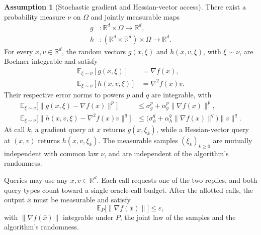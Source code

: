 \documentclass[10pt]{article}
\theoremstyle{definition}
\newtheorem{assumption}{Assumption}
\begin{document}
\begin{assumption}[Stochastic gradient and Hessian-vector access]
There exist a probability measure $\nu$ on $\Omega$ and jointly measurable maps
\[
\begin{aligned}
g &: \mathbb{R}^d\times\Omega\to\mathbb{R}^d,\\
h &: (\mathbb{R}^d\times\mathbb{R}^d)\times\Omega\to\mathbb{R}^d.
\end{aligned}
\]
For every $x,v\in\mathbb{R}^d$, the random vectors $g(x,\xi)$ and $h(x,v,\xi)$, with $\xi\sim\nu$, are Bochner integrable and satisfy
\[
\begin{aligned}
\mathbb{E}_{\xi\sim\nu}[g(x,\xi)]&=\nabla f(x),\\
\mathbb{E}_{\xi\sim\nu}[h(x,v,\xi)]&=\nabla^2 f(x)v.
\end{aligned}
\]
Their respective error norms to powers $p$ and $q$ are integrable, with
\[
\begin{aligned}
\mathbb{E}_{\xi\sim\nu}\bigl[\|g(x,\xi)-\nabla f(x)\|^p\bigr]
&\leq \sigma_g^p+\alpha_g^p\|\nabla f(x)\|^p,\\
\mathbb{E}_{\xi\sim\nu}\bigl[\|h(x,v,\xi)-\nabla^2 f(x)v\|^q\bigr]
&\leq \bigl(\sigma_h^q+\alpha_h^q\|\nabla f(x)\|^q\bigr)\|v\|^q.
\end{aligned}
\]
At call $k$, a gradient query at $x$ returns $g(x,\xi_k)$, while a Hessian-vector query at $(x,v)$ returns $h(x,v,\xi_k)$. The measurable samples $(\xi_k)_{k\geq0}$ are mutually independent with common law $\nu$, and are independent of the algorithm's randomness.
\end{assumption}

Queries may use any $x,v\in\mathbb{R}^d$. Each call requests one of the two replies, and both query types count toward a single oracle-call budget. After the allotted calls, the output $\bar{x}$ must be measurable and satisfy
\[
\mathbb{E}_{P}\bigl[\|\nabla f(\bar{x})\|\bigr]\leq\varepsilon,
\]
with $\|\nabla f(\bar{x})\|$ integrable under $P$, the joint law of the samples and the algorithm's randomness.
\end{document}
